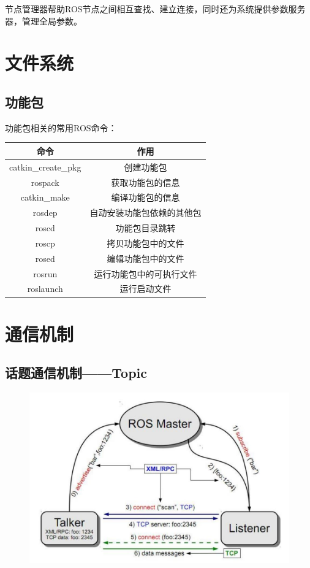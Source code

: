 \documentclass[10pt, oneside]{book}
\begin{document}
节点管理器帮助ROS节点之间相互查找、建立连接，同时还为系统提供参数服务器，管理全局参数。

\section{文件系统}

\subsection{功能包}

功能包相关的常用ROS命令：

\begin{table}[H]
    \centering
    \begin{tabular}{c|c}
    \hline
    命令                  & 作用            \\ \hline
    catkin\_create\_pkg & 创建功能包         \\
    rospack             & 获取功能包的信息      \\
    catkin\_make        & 编译功能包的信息      \\
    rosdep              & 自动安装功能包依赖的其他包 \\
    roscd               & 功能包目录跳转       \\
    roscp               & 拷贝功能包中的文件     \\
    rosed               & 编辑功能包中的文件     \\
    rosrun              & 运行功能包中的可执行文件  \\
    roslaunch           & 运行启动文件        \\ \hline
    \end{tabular}
\end{table}

\section{通信机制}

\subsection{话题通信机制——Topic}

\begin{figure}[H]
    \centering
    \includegraphics[width=0.7\linewidth]{image/话题通信机制.jpg}
\end{figure}
\end{document}
